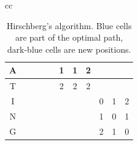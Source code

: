 \begin{table}
\begin{center}
\begin{tabular}[c]{cc}
{\begin{tabular}[c]{c|c|c|c|c|c|c|c|c|c|c|}
				A &                     &                     &                     &                       & \cellcolor{green!25}1 & \cellcolor{blue!75}1  & \cellcolor{green!25}2 &                       &                       &                       \\\hline
				T &                     &                     &                     &                       & \cellcolor{green!25}2 & \cellcolor{green!25}2 & \cellcolor{blue!25}2  &                       &                       &                       \\\hline
				I &                     &                     &                     &                       &                       &                       &                       & \cellcolor{blue!25}0  & \cellcolor{green!25}1 & \cellcolor{green!25}2 \\\hline
				N &                     &                     &                     &                       &                       &                       &                       & \cellcolor{green!25}1 & \cellcolor{blue!75}0  & \cellcolor{green!25}1 \\\hline
				G &                     &                     &                     &                       &                       &                       &                       & \cellcolor{green!25}2 & \cellcolor{green!25}1 & \cellcolor{blue!25}0  \\\hline
			\end{tabular}
		}
        \end{tabular}
	\end{center}
	\caption{Hirschberg's algorithm. Blue cells are part of the optimal path, dark-blue
    cells are new positions.}
	\label{tab:hirschbergs}
\end{table}

